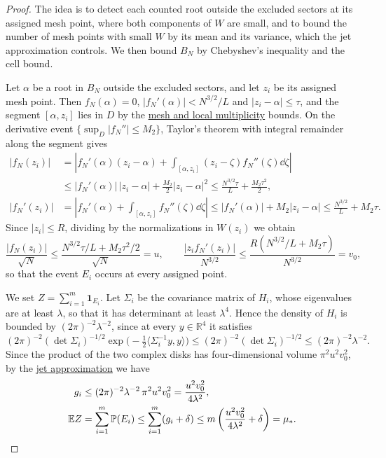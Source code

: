 \begin{proof}
The idea is to detect each counted root outside the excluded sectors at
its assigned mesh point, where both components of $W$ are small, and to
bound the number of mesh points with small $W$ by its mean and its
variance, which the jet approximation controls. We then bound $B_N$ by
Chebyshev's inequality and the cell bound.

Let $\alpha$ be a root in $B_N$ outside the excluded sectors, and let
$z_i$ be its assigned mesh point. Then $f_N(\alpha)=0$,
$|f_N'(\alpha)|<N^{3/2}/L$ and $|z_i-\alpha|\leq\tau$, and the segment
$[\alpha,z_i]$ lies in $D$ by the
\hyperref[hyp:mesh]{mesh and local multiplicity} bounds. On the
derivative event $\{\sup_D|f_N''|\leq M_2\}$, Taylor's theorem with
integral remainder along the segment gives
\begin{align*}
 |f_N(z_i)|
 &=\left|f_N'(\alpha)(z_i-\alpha)
   +\int_{[\alpha,z_i]}(z_i-\zeta)f_N''(\zeta)\dd\zeta\right|\\
 &\leq |f_N'(\alpha)|\,|z_i-\alpha|+\frac{M_2}2|z_i-\alpha|^2
 \leq\frac{N^{3/2}\tau}{L}+\frac{M_2\tau^2}2,\\
 |f_N'(z_i)|
 &=\left|f_N'(\alpha)+\int_{[\alpha,z_i]}f_N''(\zeta)\dd\zeta\right|
 \leq|f_N'(\alpha)|+M_2|z_i-\alpha|
 \leq\frac{N^{3/2}}L+M_2\tau.
\end{align*}
Since $|z_i|\leq R$, dividing by the normalizations in $W(z_i)$ we
obtain
\[
 \frac{|f_N(z_i)|}{\sqrt N}
 \leq\frac{N^{3/2}\tau/L+M_2\tau^2/2}{\sqrt N}
 =u,\qquad
 \frac{|z_if_N'(z_i)|}{N^{3/2}}
 \leq\frac{R(N^{3/2}/L+M_2\tau)}{N^{3/2}}
 =v_0,
\]
so that the event $E_i$ occurs at every assigned point.

We set $Z=\sum_{i=1}^m\boldsymbol1_{E_i}$.
Let $\Sigma_i$ be the covariance matrix of $H_i$, whose eigenvalues are at
least $\lambda$, so that it has determinant at least $\lambda^4$. Hence
the density of $H_i$ is bounded by $(2\pi)^{-2}\lambda^{-2}$, since at
every $y\in\mathbb R^4$ it satisfies
\[
 (2\pi)^{-2}(\det\Sigma_i)^{-1/2}
   \exp\bigl(-\tfrac12\langle\Sigma_i^{-1}y,y\rangle\bigr)
 \leq(2\pi)^{-2}(\det\Sigma_i)^{-1/2}
 \leq(2\pi)^{-2}\lambda^{-2}.
\]
Since the product of the two complex disks has four-dimensional volume
$\pi^2u^2v_0^2$, by the \hyperref[hyp:jets]{jet approximation} we have
\begin{align*}
 g_i
 &\leq(2\pi)^{-2}\lambda^{-2}\,\pi^2u^2v_0^2
 =\frac{u^2v_0^2}{4\lambda^2},\\
 \mathbb E Z
 &=\sum_{i=1}^m\mathbb P(E_i)
 \leq\sum_{i=1}^m(g_i+\delta)
 \leq m\left(\frac{u^2v_0^2}{4\lambda^2}+\delta\right)
 =\mu_*.
\end{align*}


\end{proof}

